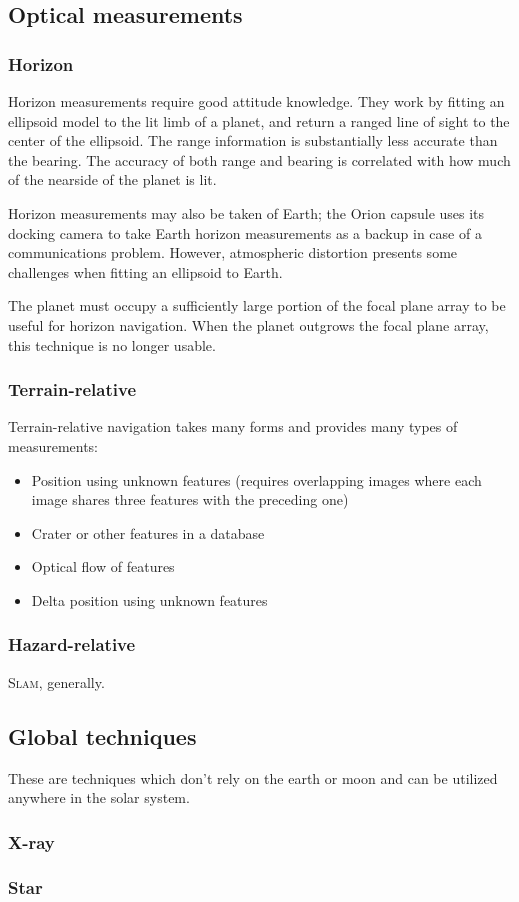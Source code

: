 \documentclass[12pt]{article}
\begin{document}
\subsection{Optical measurements}

\subsubsection{Horizon}
Horizon measurements require good attitude knowledge. They work by fitting an ellipsoid model to the lit limb of a planet, and return a ranged line of sight to the center of the ellipsoid. The range information is substantially less accurate than the bearing. The accuracy of both range and bearing is correlated with how much of the nearside of the planet is lit.

Horizon measurements may also be taken of Earth; the Orion capsule uses its docking camera to take Earth horizon measurements as a backup in case of a communications problem. However, atmospheric distortion presents some challenges when fitting an ellipsoid to Earth.

The planet must occupy a sufficiently large portion of the focal plane array to be useful for horizon navigation. When the planet outgrows the focal plane array, this technique is no longer usable.

\subsubsection{Terrain-relative}
Terrain-relative navigation takes many forms and provides many types of measurements:
\begin{itemize}
\item Position using unknown features (requires overlapping images where each image shares three features with the preceding one)
\item Crater or other features in a database \citep{Christian2020}
\item Optical flow of features
\item Delta position using unknown features
\end{itemize}

\subsubsection{Hazard-relative}
\textsc{Slam}, generally.

\subsection{Global techniques}
These are techniques which don't rely on the earth or moon and can be utilized anywhere in the solar system.

\subsubsection{X-ray}

\subsubsection{Star}




\end{document}
